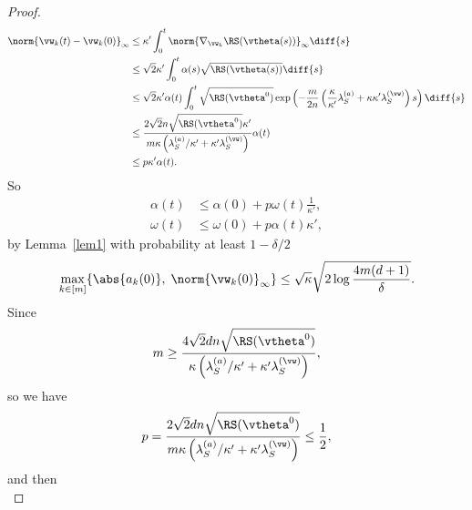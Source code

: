 \documentclass{article}
\begin{document}
\begin{proof}
    \begin{equation}
        \begin{aligned}
            \norm{\vw_k(t) - \vw_k(0)}_{\infty}
             & \leq \kappa'\int_{0}^{t} \norm{\nabla_{\vw_k}\RS(\vtheta(s))}_{\infty}\diff{s}                                                                                                            \\
             & \leq \sqrt{2}\kappa' \int_{0}^t \alpha(s)\sqrt{\RS(\vtheta(s))} \diff{s}                                                                                                                  \\
             & \leq \sqrt{2}\kappa' \alpha(t) \int_{0}^{t} \sqrt{\RS(\vtheta^0)}\exp\left(-\frac{m}{2n}\left(\frac{\kappa}{\kappa'}\lambda_S^{(a)}+\kappa\kappa'\lambda_S^{(\vw)}\right)s\right)\diff{s} \\
             & \leq \frac{2\sqrt{2}n\sqrt{\RS(\vtheta^0)}\kappa'}{m\kappa\left(\lambda^{(a)}_S/\kappa'+\kappa'\lambda_S^{(\vw)}\right)}\alpha(t)                                                         \\
             & \leq p\kappa'\alpha(t).
        \end{aligned}
    \end{equation}
    So
    \begin{equation}
        \begin{aligned}
            \alpha(t) & \leq\alpha(0)+p\omega(t)\frac{1}{\kappa'}, \\
            \omega(t) & \leq\omega(0)+p\alpha(t)\kappa',
        \end{aligned}
    \end{equation}
    by Lemma~\ref{lem1} with probability at least $1 - \delta/2$
    \begin{equation}
        \max\limits_{k\in[m]}\{\abs{a_k(0)},\;\norm{\vw_k(0)}_{\infty}\}\leq\sqrt{\kappa}\sqrt{2\log\frac{4m(d+1)}{\delta}}.
    \end{equation}
    Since
    \begin{equation}
        m \geq \frac{4\sqrt{2}dn\sqrt{\RS(\vtheta^0)}}{\kappa\left(\lambda_S^{(a)}/\kappa'+\kappa'\lambda_S^{(\vw)}\right)},
    \end{equation}
    so we have
    \begin{equation}
        p=\frac{2\sqrt{2}dn\sqrt{\RS(\vtheta^0)}}{m\kappa\left(\lambda_S^{(a)}/\kappa'+\kappa'\lambda_S^{(\vw)}\right)}\leq \frac{1}{2},
    \end{equation}
    and then
    \begin{equation}

\end{equation}
\end{proof}
\end{document}
